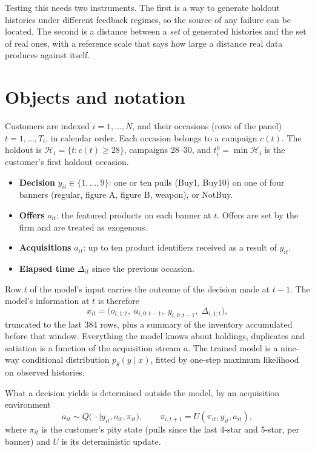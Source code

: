 \documentclass[11pt]{article}
\begin{document}
Testing this needs two instruments. The first is a way to generate holdout
histories under different feedback regimes, so the source of any failure can
be located. The second is a distance between a \emph{set} of generated histories
and the set of real ones, with a reference scale that says how large a distance
real data produces against itself.

\section{Objects and notation}\label{sec:objects}

Customers are indexed $i = 1,\dots,N$, and their occasions (rows of the panel)
$t = 1,\dots,T_i$, in calendar order. Each occasion belongs to a campaign
$c(t)$. The holdout is $\mathcal{H}_i = \{t : c(t) \ge 28\}$, campaigns 28--30,
and $t_i^0 = \min \mathcal{H}_i$ is the customer's first holdout occasion.

\begin{itemize}
\item \textbf{Decision} $y_{it} \in \{1,\dots,9\}$: one or ten pulls
  (Buy1, Buy10) on one of four banners (regular, figure A, figure B, weapon),
  or NotBuy.
\item \textbf{Offers} $o_{it}$: the featured products on each banner at $t$.
  Offers are set by the firm and are treated as exogenous.
\item \textbf{Acquisitions} $a_{it}$: up to ten product identifiers received
  as a result of $y_{it}$.
\item \textbf{Elapsed time} $\Delta_{it}$ since the previous occasion.
\end{itemize}

\noindent Row $t$ of the model's input carries the outcome of the decision made
at $t-1$. The model's information at $t$ is therefore
\begin{equation}
x_{it} = \big(o_{i,1:t},\; a_{i,0:t-1},\; y_{i,0:t-1},\; \Delta_{i,1:t}\big),
\label{eq:info}
\end{equation}
truncated to the last 384 rows, plus a summary of the inventory accumulated
before that window. Everything the model knows about holdings, duplicates and
satiation is a function of the acquisition stream $a$. The trained model is a
nine-way conditional distribution $p_\theta(y \mid x)$, fitted by one-step
maximum likelihood on observed histories.

What a decision yields is determined outside the model, by an acquisition
environment
\begin{equation}
a_{it} \sim Q\big(\,\cdot \mid y_{it}, o_{it}, \pi_{it}\big),
\qquad \pi_{i,t+1} = U(\pi_{it}, y_{it}, a_{it}),
\label{eq:env}
\end{equation}
where $\pi_{it}$ is the customer's pity state (pulls since the last 4-star and
5-star, per banner) and $U$ is its deterministic update.
\end{document}

